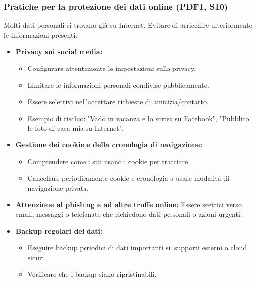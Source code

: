 \documentclass{beamer}
\begin{document}
\begin{frame}
  \frametitle{Pratiche per la protezione dei dati online (PDF1, S10)}
  Molti dati personali si trovano già su Internet. Evitare di arricchire ulteriormente le informazioni presenti.
  \begin{itemize}
    \item \textbf{Privacy sui social media:}
    \begin{itemize}
        \item Configurare attentamente le impostazioni sulla privacy.
        \item Limitare le informazioni personali condivise pubblicamente.
        \item Essere selettivi nell'accettare richieste di amicizia/contatto.
        \item Esempio di rischio: "Vado in vacanza e lo scrivo su Facebook", "Pubblico le foto di casa mia su Internet".
    \end{itemize}
    \item \textbf{Gestione dei cookie e della cronologia di navigazione:}
    \begin{itemize}
        \item Comprendere come i siti usano i cookie per tracciare.
        \item Cancellare periodicamente cookie e cronologia o usare modalità di navigazione privata.
    \end{itemize}
    \item \textbf{Attenzione al phishing e ad altre truffe online:} Essere scettici verso email, messaggi o telefonate che richiedono dati personali o azioni urgenti.
    \item \textbf{Backup regolari dei dati:}
    \begin{itemize}
        \item Eseguire backup periodici di dati importanti su supporti esterni o cloud sicuri.
        \item Verificare che i backup siano ripristinabili.
    \end{itemize}
  \end{itemize}
\end{frame}
\end{document}

